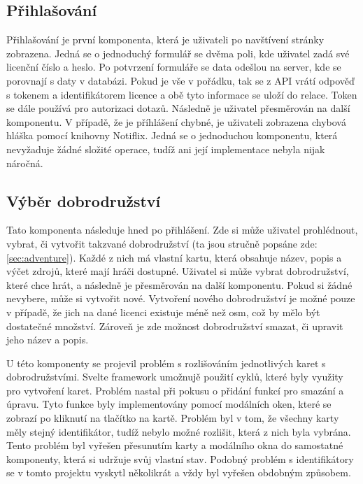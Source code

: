 \subsection{Přihlašování}
Přihlašování je první komponenta, která je uživateli po navštívení stránky zobrazena. Jedná se o jednoduchý formulář se dvěma poli, kde uživatel zadá své licenční číslo a heslo. Po potvrzení formuláře se data odešlou na server, kde se porovnají s daty v databázi. Pokud je vše v pořádku, tak se z API vrátí odpověď s tokenem a identifikátorem licence a obě tyto informace se uloží do relace. Token se dále používá pro autorizaci dotazů. Následně je uživatel přesměrován na další komponentu. V případě, že je příhlášení chybné, je uživateli zobrazena chybová hláška pomocí knihovny Notiflix. Jedná se o jednoduchou komponentu, která nevyžaduje žádné složité operace, tudíž ani její implementace nebyla nijak náročná.

\subsection{Výběr dobrodružství}
Tato komponenta následuje hned po přihlášení. Zde si může uživatel prohlédnout, vybrat, či vytvořit takzvané dobrodružství (ta jsou stručně popsáne zde: \ref{sec:adventure}). Každé z nich má vlastní kartu, která obsahuje název, popis a výčet zdrojů, které mají hráči dostupné. Uživatel si může vybrat dobrodružství, které chce hrát, a následně je přesměrován na další komponentu. Pokud si žádné nevybere, může si vytvořit nové. Vytvoření nového dobrodružství je možné pouze v případě, že jich na dané licenci existuje méně než osm, což by mělo být dostatečné množství. Zároveň je zde možnost dobrodružství smazat, či upravit jeho název a popis.

U této komponenty se projevil problém s rozlišováním jednotlivých karet s dobrodružstvími. Svelte framework umožnujě použití cyklů, které byly využity pro vytvoření karet. Problém nastal při pokusu o přidání funkcí pro smazání a úpravu. Tyto funkce byly implementovány pomocí modálních oken, které se zobrazí po kliknutí na tlačítko na kartě. Problém byl v tom, že všechny karty měly stejný identifikátor, tudíž nebylo možné rozlišit, která z nich byla vybrána. Tento problém byl vyřešen přesunutím karty a modálního okna do samostatné komponenty, která si udržuje svůj vlastní stav. Podobný problém s identifikátory se v tomto projektu vyskytl několikrát a vždy byl vyřešen obdobným způsobem.

